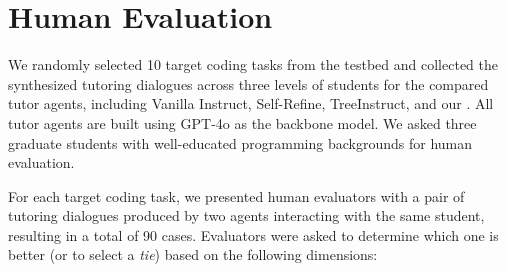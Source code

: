 \section{Human Evaluation}
\label{appendix:human_eval}
We randomly selected 10 target coding tasks from the testbed and collected the synthesized tutoring dialogues across three levels of students for the compared tutor agents, including Vanilla Instruct, Self-Refine, TreeInstruct, and our \model. All tutor agents are built using GPT-4o as the backbone model. We asked three graduate students with well-educated programming backgrounds for human evaluation. 

For each target coding task, we presented human evaluators with a pair of tutoring dialogues produced by two agents interacting with the same student, resulting in a total of 90 cases.
Evaluators were asked to determine which one is better (or to select a \textit{tie}) based on the following dimensions: 

